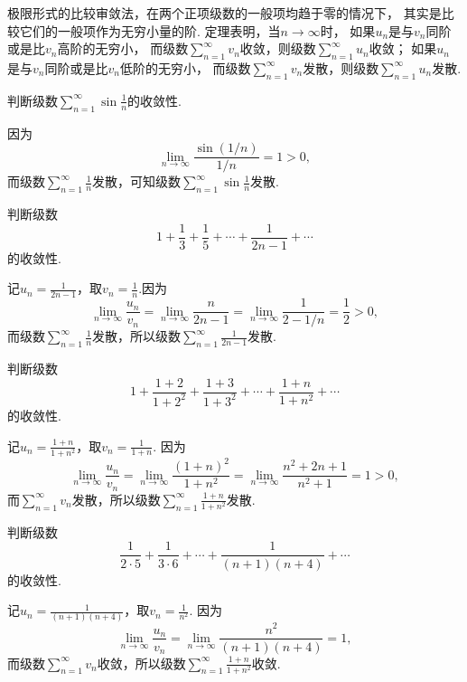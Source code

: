极限形式的比较审敛法，在两个正项级数的一般项均趋于零的情况下，
其实是比较它们的一般项作为无穷小量的阶.
定理表明，当\(n \to \infty\)时，
如果\(u_n\)是与\(v_n\)同阶或是比\(v_n\)高阶的无穷小，
而级数\(\sum\limits_{n=1}^\infty v_n\)收敛，则级数\(\sum\limits_{n=1}^\infty u_n\)收敛；
如果\(u_n\)是与\(v_n\)同阶或是比\(v_n\)低阶的无穷小，
而级数\(\sum\limits_{n=1}^\infty v_n\)发散，则级数\(\sum\limits_{n=1}^\infty u_n\)发散.

\begin{example}
判断级数\(\sum\limits_{n=1}^\infty \sin\frac{1}{n}\)的收敛性.
\begin{solution}
因为\[
\lim\limits_{n\to\infty} \frac{\sin(1/n)}{1/n} = 1 > 0,
\]而级数\(\sum\limits_{n=1}^\infty \frac{1}{n}\)发散，可知级数\(\sum\limits_{n=1}^\infty \sin\frac{1}{n}\)发散.
\end{solution}
\end{example}

\begin{example}
判断级数\[
1 + \frac{1}{3} + \frac{1}{5} + \dotsb + \frac{1}{2n-1} + \dotsb
\]的收敛性.
\begin{solution}
记\(u_n = \frac{1}{2n-1}\)，取\(v_n = \frac{1}{n}\).因为\[
\lim\limits_{n\to\infty} \frac{u_n}{v_n} = \lim\limits_{n\to\infty} \frac{n}{2n-1} = \lim\limits_{n\to\infty} \frac{1}{2-1/n} = \frac{1}{2} > 0,
\]而级数\(\sum\limits_{n=1}^\infty \frac{1}{n}\)发散，所以级数\(\sum\limits_{n=1}^\infty \frac{1}{2n-1}\)发散.
\end{solution}
\end{example}

\begin{example}
判断级数\[
1 + \frac{1+2}{1+2^2} + \frac{1+3}{1+3^2} + \dotsb + \frac{1+n}{1+n^2} + \dotsb
\]的收敛性.
\begin{solution}
记\(u_n = \frac{1+n}{1+n^2}\)，取\(v_n = \frac{1}{1+n}\).
因为\[
\lim\limits_{n\to\infty} \frac{u_n}{v_n}
= \lim\limits_{n\to\infty} \frac{(1+n)^2}{1+n^2}
= \lim\limits_{n\to\infty} \frac{n^2 + 2n + 1}{n^2 + 1}
= 1 > 0,
\]而\(\sum\limits_{n=1}^\infty v_n\)发散，所以级数\(\sum\limits_{n=1}^\infty \frac{1+n}{1+n^2}\)发散.
\end{solution}
\end{example}

\begin{example}
判断级数\[
\frac{1}{2\cdot5} + \frac{1}{3\cdot6} + \dotsb + \frac{1}{(n+1)(n+4)} + \dotsb
\]的收敛性.
\begin{solution}
记\(u_n = \frac{1}{(n+1)(n+4)}\)，取\(v_n = \frac{1}{n^2}\).
因为\[
\lim\limits_{n\to\infty} \frac{u_n}{v_n} = \lim\limits_{n\to\infty} \frac{n^2}{(n+1)(n+4)} = 1,
\]而级数\(\sum\limits_{n=1}^\infty v_n\)收敛，所以级数\(\sum\limits_{n=1}^\infty \frac{1+n}{1+n^2}\)收敛.
\end{solution}
\end{example}

